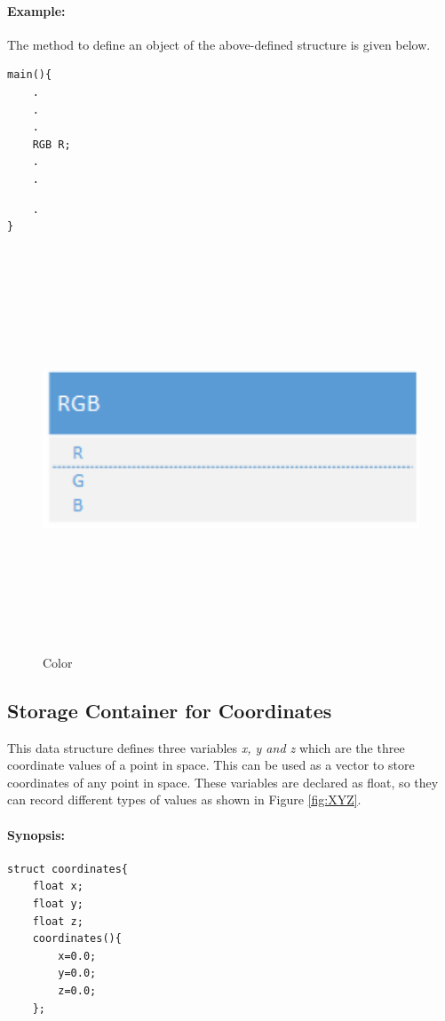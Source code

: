 \paragraph{Example:}
The method to define an object of the above-defined structure is given below.
\begin{lstlisting}
main(){ 
    .
    .
    .
    RGB R;
    .
    .
\end{lstlisting}
\pagebreak
\begin{lstlisting}
    .
}  
\end{lstlisting}
\begin{figure}[ht]
    \centering
    \includegraphics[width=12cm,height=12cm,keepaspectratio]{Pictures/RGB}
    \caption{Color}
    \label{fig:RGB}
\end{figure}
\subsection{Storage Container for Coordinates}
This data structure defines three variables \textit{x, y and z} which are the three coordinate values of a point in space. This can be used as a vector to store coordinates of any point in space. These variables are declared as float, so they can record different types of values as shown in Figure \ref{fig:XYZ}.
\paragraph{Synopsis:}
\begin{lstlisting}
struct coordinates{
    float x;
    float y;
    float z;
    coordinates(){
        x=0.0;
        y=0.0;
        z=0.0;
    };
\end{lstlisting}
